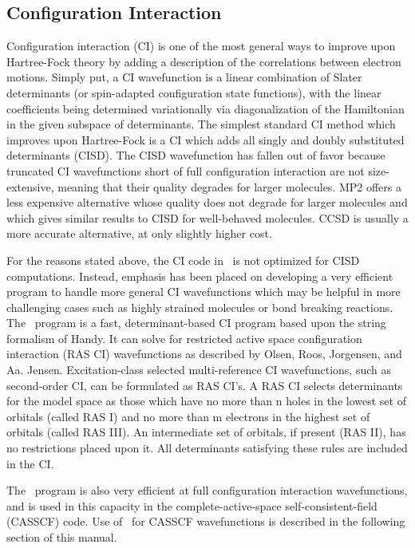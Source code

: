 \subsection{Configuration Interaction} \label{detci}
                                                                                
Configuration interaction (CI) is one of the most general ways to improve
upon Hartree-Fock theory by adding a description of the correlations
between electron motions.  Simply put, a CI wavefunction is a linear
combination of Slater determinants (or spin-adapted configuration
state functions), with the linear coefficients being determined 
variationally via diagonalization of the Hamiltonian in the given
subspace of determinants.  The simplest standard CI method which improves
upon Hartree-Fock is a CI which adds all singly and doubly substituted
determinants (CISD).  The CISD wavefunction
has fallen out of favor because truncated CI wavefunctions
short of full configuration interaction
are not size-extensive, meaning that their
quality degrades for larger molecules.  MP2 offers a less expensive
alternative whose quality does not degrade for larger molecules and which 
gives similar results to CISD for well-behaved molecules.  CCSD is 
usually a more accurate alternative, at only slightly higher
cost.

For the reasons stated above, the CI code in \PSIthree\ is not optimized
for CISD computations.
Instead, emphasis has been placed on developing a very efficient
program to handle more general CI wavefunctions which may be helpful
in more challenging cases such as highly strained molecules or bond
breaking reactions.  The \PSIdetci\ program is a fast, determinant-based
CI program based upon the string formalism of Handy.  It can solve for
restricted active space configuration interaction (RAS CI) wavefunctions
as described by Olsen, Roos, Jorgensen, and Aa. Jensen.  Excitation-class
selected multi-reference CI wavefunctions, such as second-order
CI, can be formulated as RAS CI's.  A RAS CI selects determinants
for the model space as those which have no more than n holes in 
the lowest set of orbitals (called RAS I) and no more than m electrons
in the highest set of orbitals (called RAS III).  An intermediate
set of orbitals, if present (RAS II), has no restrictions placed upon it.
All determinants satisfying these rules are included in the CI.

The \PSIdetci\ program is also very efficient
at full configuration interaction wavefunctions, and is used in this
capacity in the complete-active-space self-consistent-field (CASSCF)
code.  Use of \PSIdetci\ for CASSCF wavefunctions is described
in the following section of this manual.

